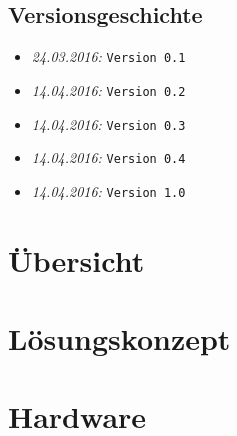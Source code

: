\documentclass{fhnwreport/fhnwreport}
\begin{document}


\tableofcontents
\vspace{10mm}
\subsection*{Versionsgeschichte}
\begin{itemize}
    \item[]
        \emph{24.03.2016:} \texttt{Version 0.1}
	\item[]
        \emph{14.04.2016:} \texttt{Version 0.2}
	\item[]
        \emph{14.04.2016:} \texttt{Version 0.3}
	\item[]
        \emph{14.04.2016:} \texttt{Version 0.4}
	\item[]
        \emph{14.04.2016:} \texttt{Version 1.0}
\end{itemize}
\clearpage

\section{\"Ubersicht}
\label{sec:ubersicht}


%

\clearpage
\section{L\"osungskonzept}
\label{sec:losungskonzept}


\clearpage
\section{Hardware}
\label{sec:hardware}

\end{document}
